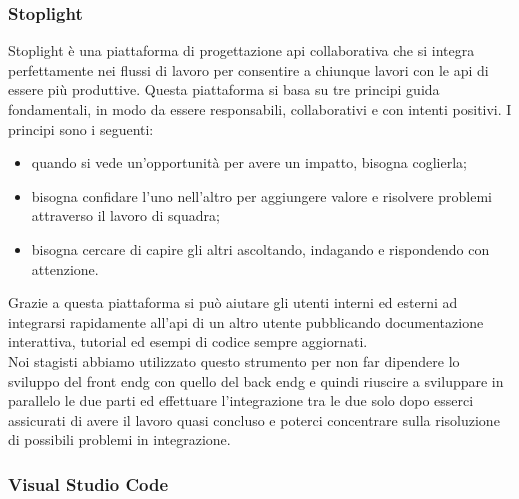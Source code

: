 \subsubsection{Stoplight}
\label{subsubsec:stoplight}

Stoplight è una piattaforma di progettazione \gls{api} collaborativa che si integra perfettamente nei flussi di lavoro per consentire a chiunque lavori con le \gls{api} di essere più produttive. Questa piattaforma si basa su tre principi guida fondamentali, in modo da essere responsabili, collaborativi e con intenti positivi. I principi sono i seguenti:
\begin{itemize}
	\item quando si vede un'opportunità per avere un impatto, bisogna coglierla;
	\item bisogna confidare l'uno nell'altro per aggiungere valore e risolvere problemi attraverso il lavoro di squadra;
	\item bisogna cercare di capire gli altri ascoltando, indagando e rispondendo con attenzione.
\end{itemize}
Grazie a questa piattaforma si può aiutare gli utenti interni ed esterni ad integrarsi rapidamente all'\gls{api} di un altro utente pubblicando documentazione interattiva, tutorial ed esempi di codice sempre aggiornati.\\
Noi stagisti abbiamo utilizzato questo strumento per non far dipendere lo sviluppo del \gls{front endg} con quello del \gls{back endg} e quindi riuscire a sviluppare in parallelo le due parti ed effettuare l'integrazione tra le due solo dopo esserci assicurati di avere il lavoro quasi concluso e poterci concentrare sulla risoluzione di possibili problemi in integrazione.

\subsubsection{Visual Studio Code}
\label{subsubsec:visual-studio-code}

